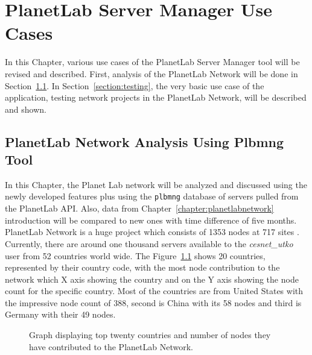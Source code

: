 {{{{{{{\chapter{PlanetLab Server Manager Use Cases}
\label{chapter:usecase}
In this Chapter, various use cases of the PlanetLab Server Manager tool will be revised and described. First, analysis of the PlanetLab Network will be done in Section~\ref{section:analysis}. In Section~\ref{section:testing}, the very basic use case of the application, testing network projects in the PlanetLab Network, will be described and shown.

\section{PlanetLab Network Analysis Using Plbmng Tool}
\label{section:analysis}
In this Chapter, the Planet Lab network will be analyzed and discussed using the newly developed features plus using the \texttt{plbmng} database of servers pulled from the PlanetLab API. Also, data from Chapter~\ref{chapter:planetlabnetwork} introduction will be compared to new ones with time difference of five months.\\
PlanetLab Network is a huge project which consists of 1353 nodes at 717 sites \cite{planetlabmain}. Currently, there are around one thousand servers available to the \textit{cesnet\_utko} user from 52 countries world wide. The Figure~\ref{fig:allcountriesgraph} shows 20 countries, represented by their country code, with the most node contribution to the network which X axis showing the country and on the Y axis showing the node count for the specific country. Most of the countries are from United States with the impressive node count of 388, second is China with its 58 nodes and third is Germany with their 49 nodes. 

\begin{figure}[H]
	\centering
	\caption{Graph displaying top twenty countries and number of nodes they have contributed to the PlanetLab Network.}
	\label{fig:allcountriesgraph}
\end{figure}

}}}}}}}
